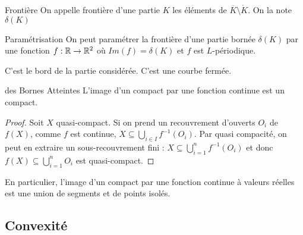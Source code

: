 \documentclass{cours}
\begin{document}
\begin{définition}{Frontière}{}
On appelle frontière d'une partie $K$ les éléments de $\overline{K} \setminus \mathring{K}$. On la note $\delta(K)$
\end{définition}

\begin{propositionfr}{Paramétrisation}{}
    On peut paramétrer la frontière d'une partie bornée $\delta(K)$ par une fonction $f : \mathbb{R} \to \mathbb{R}^{2}$ où $Im(f) = \delta(K)$ et $f$ est $L$-périodique.
\end{propositionfr}
C'est le bord de la partie considérée. C'est une courbe fermée.

\begin{théorème}{des Bornes Atteintes}{}
L'image d'un compact par une fonction continue est un compact.
\end{théorème}
\begin{proof}
    Soit $X$ quasi-compact. Si on prend un recouvrement d'ouverts $O_{i}$ de $f(X)$, comme $f$ est continue, $X \subseteq\bigcup_{i \in I} f^{-1}(O_{i})$. Par quasi compacité, on peut en extraire un sous-recouvrement fini : $X \subseteq \bigcup_{i = 1}^{n} f^{-1}(O_{i})$ et donc $f(X) \subseteq \bigcup_{i = 1}^{n} O_{i}$ est quasi-compact.
\end{proof}
En particulier, l'image d'un compact par une fonction continue à valeurs réelles est une union de segments et de points isolés.

\subsection{Convexité}
\end{document}
